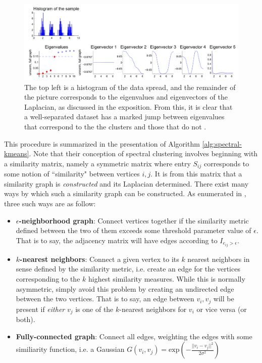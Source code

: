 \documentclass{article}
\begin{document}
\begin{figure}
    \centering
    \includegraphics[width=.95\textwidth]{spectral_example.png}
    \caption[Spectral Eigenvector]{The top left is a histogram of the data spread, and the remainder of the picture corresponds to the eigenvalues and eigenvectors of the Laplacian, as discussed in the exposition. From this, it is clear that a well-separated dataset has a marked jump between eigenvalues that correspond to the the clusters and those that do not \cite{spectral}.}
    \label{fig:spectral_example}
\end{figure}

This procedure is summarized in the presentation of Algorithm \ref{alg:spectral-kmeans}. Note that their conception of spectral clustering involves beginning with a similarity matrix, namely a symmetric matrix where entry $S_{ij}$ corresponds to some notion of ``similarity" between vertices $i,j$. It is from this matrix that a similarity graph is \textit{constructed} and its Laplacian determined. There exist many ways by which such a similarity graph can be constructed. As enumerated in \cite{spectral}, three such ways are as follow:

\begin{itemize}
    \item \textbf{$\epsilon$-neighborhood graph}: Connect vertices together if the similarity metric defined between the two of them exceeds some threshold parameter value of $\epsilon$. That is to say, the adjacency matrix will have edges according to $I_{e_{ij}>\epsilon}$.
    \item \textbf{$k$-nearest neighbors}: Connect a given vertex to its $k$ nearest neighbors in sense defined by the similarity metric, i.e. create an edge for the vertices corresponding to the $k$ highest similarity measures. While this is normally asymmetric, simply avoid this problem by creating an undirected edge between the two vertices. That is to say, an edge between $v_i,v_j$ will be present if \textit{either} $v_j$ is one of the $k$-nearest neighbors for $v_i$ or vice versa (or both).
    \item \textbf{Fully-connected graph}: Connect all edges, weighting the edges with some similiarity function, i.e. a Gaussian $G(v_i,v_j) = \text{exp}\left(-\frac{|| v_i - v_j ||^2}{2\sigma^2}\right)$
\end{itemize}
\end{document}
